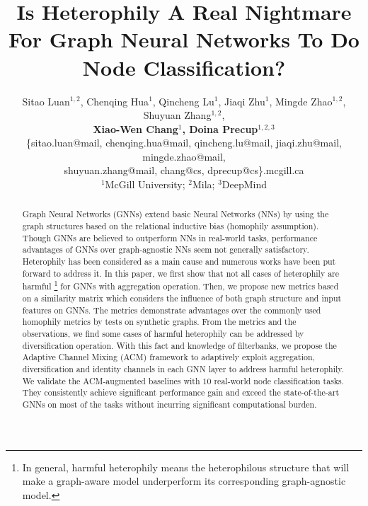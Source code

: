 \documentclass{article}
\title{Is Heterophily A Real Nightmare For Graph Neural Networks To Do Node Classification?}
\author{
Sitao Luan$^{1,2}$, Chenqing Hua$^{1}$, Qincheng Lu$^{1}$, Jiaqi Zhu$^{1}$, Mingde Zhao$^{1,2}$, Shuyuan Zhang$^{1,2}$,\\
\textbf{ Xiao-Wen Chang$^{1}$, Doina Precup$^{1,2,3}$}\\
\{sitao.luan@mail, chenqing.hua@mail, qincheng.lu@mail, jiaqi.zhu@mail, mingde.zhao@mail,\\ shuyuan.zhang@mail, chang@cs, dprecup@cs\}.mcgill.ca\\
$^1$McGill University; $^2$Mila; $^3$DeepMind\\
}
\newcommand{\0}{{\boldsymbol{0}}}
\newcommand{\6}{{\partial}}
\newcommand{\8}{{\infty}}
\newcommand{\4}{{\nabla}}
\begin{document}
\maketitle

\begin{abstract}
  Graph Neural Networks (GNNs) extend basic Neural Networks (NNs) by using the graph structures based on the relational inductive bias (homophily assumption). Though GNNs are believed to outperform NNs in real-world tasks, performance advantages of GNNs over graph-agnostic NNs seem not generally satisfactory. Heterophily has been considered as a main cause and numerous works have been put forward to address it. In this paper, we first show that not all cases of heterophily are harmful \footnote{In general, harmful heterophily means the heterophilous structure that will make a graph-aware model underperform its corresponding graph-agnostic model.} for GNNs with aggregation operation. Then, we propose new metrics based on a similarity matrix which considers the influence of both graph structure and input features on GNNs. The metrics demonstrate advantages over the commonly used homophily metrics by tests on synthetic graphs. From the metrics and the observations, we find some cases of harmful heterophily can be addressed by diversification operation. With this fact and knowledge of filterbanks, we propose the Adaptive Channel Mixing (ACM) framework to adaptively exploit aggregation, diversification and identity channels in each GNN layer to address harmful heterophily. We validate the ACM-augmented baselines with $10$ real-world node classification tasks. They consistently achieve significant performance gain and exceed the state-of-the-art GNNs on most of the tasks without incurring significant computational burden. \end{abstract}
\end{document}
